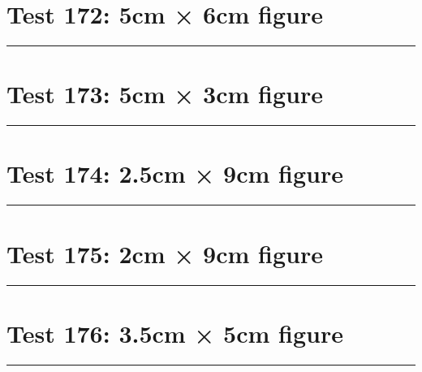 \documentclass[a4paper,11pt]{article}
\begin{document}
\section*{Test 172: 5cm × 6cm figure}
\begin{swarmwrap}%
  \begin{minipage}[t]{5cm}
    \centering
    \rule{\linewidth}{6cm}
  \end{minipage}%
\end{swarmwrap}%
\swarmwrapnext
\lipsum[64]
\lipsum[65]
\lipsum[66]
\lipsum[67]
\lipsum[68]
\section*{Test 173: 5cm × 3cm figure}
\begin{swarmwrap}%
  \begin{minipage}[t]{5cm}
    \centering
    \rule{\linewidth}{3cm}
  \end{minipage}%
\end{swarmwrap}%
\swarmwrapnext
\lipsum[117]
\lipsum[118]
\lipsum[119]
\lipsum[120]
\lipsum[121]
\section*{Test 174: 2.5cm × 9cm figure}
\begin{swarmwrap}%
  \begin{minipage}[t]{2cm}
    \centering
    \rule{\linewidth}{9cm}
  \end{minipage}%
\end{swarmwrap}%
\swarmwrapnext
\lipsum[88]
\lipsum[89]
\lipsum[90]
\lipsum[91]
\lipsum[92]
\lipsum[93]
\section*{Test 175: 2cm × 9cm figure}
\begin{swarmwrap}%
  \begin{minipage}[t]{2cm}
    \centering
    \rule{\linewidth}{9cm}
  \end{minipage}%
\end{swarmwrap}%
\swarmwrapnext
\lipsum[48]
\lipsum[49]
\lipsum[50]
\lipsum[51]
\lipsum[52]
\section*{Test 176: 3.5cm × 5cm figure}
\begin{swarmwrap}%
  \begin{minipage}[t]{3cm}
    \centering
    \rule{\linewidth}{5cm}
  \end{minipage}%
\end{swarmwrap}%
\swarmwrapnext
\lipsum[68]
\lipsum[69]
\lipsum[70]
\lipsum[71]
\lipsum[72]
\end{document}
